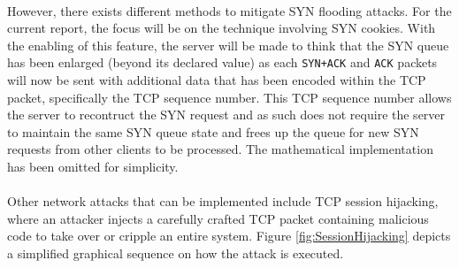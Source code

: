 \documentclass[a4paper,12pt]{article}
\begin{document}
\noindent \\However, there exists different methods to mitigate SYN flooding attacks. For the current report, the focus will be on the technique involving SYN cookies. With the enabling of this feature, the server will be made to think that the SYN queue has been enlarged (beyond its declared value) as each \texttt{SYN+ACK} and \texttt{ACK} packets will now be sent with additional data that has been encoded within the TCP packet, specifically the TCP sequence number. This TCP sequence number allows the server to recontruct the SYN request and as such does not require the server to maintain the same SYN queue state and frees up the queue for new SYN requests from other clients to be processed. The mathematical implementation has been omitted for simplicity.\\\\Other network attacks that can be implemented include TCP session hijacking, where an attacker injects a carefully crafted TCP packet containing  malicious code to take over or cripple an entire system. Figure \ref{fig:SessionHijacking} depicts a simplified graphical sequence on how the attack is executed.
\end{document}
